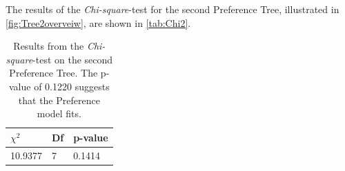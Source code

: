 \noindent
%
The results of the \textit{Chi-square}-test for the second Preference Tree, illustrated in \autoref{fig:Tree2overveiw}, are shown in \autoref{tab:Chi2}. 
%
\begin{table}[H]
\centering
\begin{tabular}{@{}lll@{}}
\toprule
$\chi^{2}$   & Df  & p-value \\ \midrule
10.9377      & 7   & 0.1414  \\ \bottomrule
\end{tabular}
\caption{Results from the \textit{Chi-square}-test on the second Preference Tree. The p-value of 0.1220 suggests that the Preference model fits.}
\label{tab:Chi2}
\end{table} 